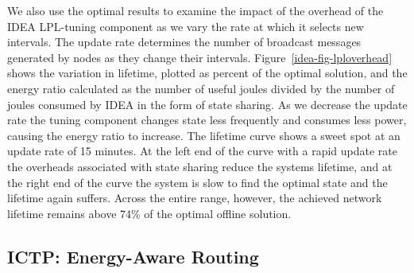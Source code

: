 We also use the optimal results to examine the impact of the overhead of the
IDEA LPL-tuning component as we vary the rate at which it selects new
intervals. The update rate determines the number of broadcast messages
generated by nodes as they change their intervals.
Figure~\ref{idea-fig-lploverhead} shows the variation in lifetime, plotted as
percent of the optimal solution, and the energy ratio calculated as the
number of useful joules divided by the number of joules consumed by IDEA in
the form of state sharing. As we decrease the update rate the tuning
component changes state less frequently and consumes less power, causing the
energy ratio to increase. The lifetime curve shows a sweet spot at an update
rate of 15 minutes. At the left end of the curve with a rapid update rate the
overheads associated with state sharing reduce the systems lifetime, and at
the right end of the curve the system is slow to find the optimal state and
the lifetime again suffers. Across the entire range, however, the achieved
network lifetime remains above 74\% of the optimal offline solution.

\subsection{ICTP: Energy-Aware Routing}

